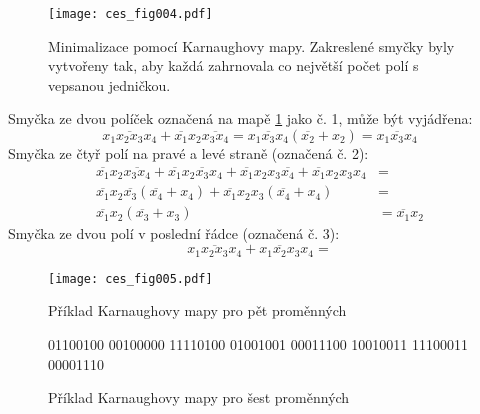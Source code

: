       \begin{figure}[ht!] %
        \centering
        \texttt{[image: ces\_fig004.pdf]}
        \caption{Minimalizace pomocí Karnaughovy mapy. Zakreslené smyčky byly vytvořeny tak, aby 
                 každá zahrnovala co největší počet polí s vepsanou 
                 jedničkou.}
        \label{ces:fig004}
      \end{figure}     
     Smyčka ze dvou políček označená na mapě \ref{ces:fig004} jako č. 1, může být vyjádřena:  
     \begin{equation}
       \overline{x_1x_2x_3x_4} + \overline{x_1}x_2\overline{x_3x_4} = \overline{x_1x_3x_4}(\overline{x_2} + x_2) =
       \overline{x_1x_3x_4}
     \end{equation}
     Smyčka ze čtyř polí na pravé a levé straně (označená č. 2):
     \begin{align}
       \overline{x_1}x_2\overline{x_3x_4} + 
       \overline{x_1}x_2\overline{x_3}x_4 + 
       \overline{x_1}x_2x_3\overline{x_4} +
       \overline{x_1}x_2x_3x_4                                &=               \\ \nonumber
       \overline{x_1}x_2\overline{x_3}(\overline{x_4}+x_4) +  
       \overline{x_1}x_2x_3(\overline{x_4}+x_4)               &=               \\ \nonumber
       \overline{x_1}x_2(\overline{x_3}+x_3)                  &= 
       \overline{x_1}x_2 
     \end{align}
     Smyčka ze dvou polí v poslední řádce (označená č. 3):
     \begin{equation}
       x_1\overline{x_2x_3}x_4 + x_1\overline{x_2}x_3x_4 = 
     \end{equation}

      \begin{figure}[ht!] %
        \centering
        \texttt{[image: ces\_fig005.pdf]}
        \caption{Příklad Karnaughovy mapy pro pět proměnných}
        \label{ces:fig005}
      \end{figure}

     \begin{figure}[hb!]
         \centering
          {{0}{1}{1}{0}{0}{1}{0}{0}%
           {0}{0}{1}{0}{0}{0}{0}{0}%
           {1}{1}{1}{1}{0}{1}{0}{0}%
           {0}{1}{0}{0}{1}{0}{0}{1}%
           {0}{0}{0}{1}{1}{1}{0}{0}%
           {1}{0}{0}{1}{0}{0}{1}{1}%
           {1}{1}{1}{0}{0}{0}{1}{1}%
           {0}{0}{0}{0}{1}{1}{1}{0}}{}%
        \caption{Příklad Karnaughovy mapy pro šest proměnných}\label{CES:karnaugh_6}
      \end{figure}

\printbibliography[title={Seznam literatury}, heading=subbibliography]

